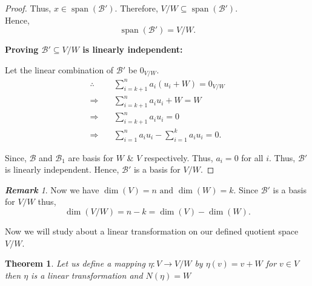 \documentclass[12pt, a4paper]{article}
\newtheorem{theorem}{Theorem}[section]
\theoremstyle{definition}
\theoremstyle{remark}
\newtheorem*{remark}{\textbf{Remark}}
\newcommand{\B}{\mathscr{B}}
\DeclareMathOperator{\Span}{span}
\begin{document}
\begin{proof}
		Thus, $x \in \Span(\B')$. Therefore, $V/W \subseteq \Span(\B')$. \\
		Hence, 
		\[ \Span(\B') = V/W. \]
		
		\vspace{0.3cm}
		
		\noindent \textbf{Proving $\B' \subseteq V/W$ is linearly independent:}
		
		\vspace{0.3cm}
		
		\noindent Let the linear combination of $\B'$ be $0_{V/W}$.
		\begin{align*}
			\therefore \quad & \sum_{i=k+1}^n a_i(u_i+W) = 0_{V/W} \\
			\Rightarrow \quad & \sum_{i=k+1}^n a_iu_i + W = W \\
			\Rightarrow \quad & \sum_{i=k+1}^n a_iu_i = 0 \\
			\Rightarrow \quad & \sum_{i=1}^n a_iu_i - \sum_{i=1}^k a_iu_i = 0.
		\end{align*}
		
		Since, $\B$ and $\B_1$ are basis for $W$ \& $V$ respectively. Thus, $a_i = 0$ for all $i$. Thus, $\B'$ is linearly independent. Hence, $\B'$ is a basis for $V/W$.
	\end{proof}
	
	\begin{remark}
		Now we have $\dim(V) = n \text{ and } \dim(W) = k$. Since $\B'$ is a basis for $V/W$ thus,
		\[
		\dim(V/W) = n - k = \dim(V) - \dim(W).
		\]
	\end{remark}
	
	Now we will study about a linear transformation on our defined quotient space $V/W$.
	
	\begin{theorem}
		Let us define a mapping $\eta : V \to V/W$ by $\eta(v) = v+W$ for $v \in V$ then $\eta$ is a linear transformation and $N(\eta) = W$
	\end{theorem}
	
\end{document}
